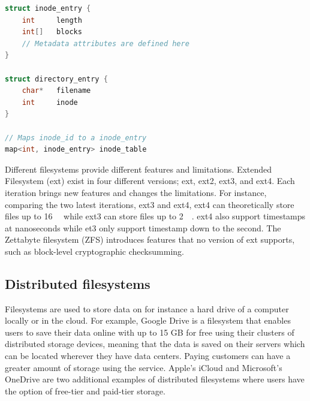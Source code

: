 \begin{minipage}{\linewidth}
\begin{lstlisting}[language=c, caption={Pseudocode of a minimalistic inode filesystem structure}, label=lst:inode_fs]
struct inode_entry {
	int 	length
	int[]	blocks
	// Metadata attributes are defined here
}

struct directory_entry {
	char*   filename
	int     inode
}

// Maps inode_id to a inode_entry
map<int, inode_entry> inode_table

\end{lstlisting}
\end{minipage}

Different filesystems provide different features and limitations. Extended Filesystem (ext) exist in four different versions; ext, ext2, ext3, and ext4. Each iteration brings new features and changes the limitations. For instance, comparing the two latest iterations, ext3 and ext4, ext4 can theoretically store files up to \SI{16}{\tebi\byte} while ext3 can store files up to \SI{2}{\tebi\byte}\cite{salterUnderstandingLinuxFilesystems2018}. ext4 also support timestamps at nanoseconds while et3 only support timestamp down to the second. The Zettabyte filesystem (ZFS) introduces features that no version of ext supports, such as block-level cryptographic checksumming.

\subsection{Distributed filesystems}
Filesystems are used to store data on for instance a hard drive of a computer locally or in the cloud. For example, Google Drive is a filesystem that enables users to save their data online with up to 15 GB for free\cite{CloudStorageWork} using their clusters of distributed storage devices, meaning that the data is saved on their servers which can be located wherever they have data centers\cite{DistributedStorageWhat}. Paying customers can have a greater amount of storage using the service. Apple's iCloud and Microsoft's OneDrive are two additional examples of distributed filesystems where users have the option of free-tier and paid-tier storage.

